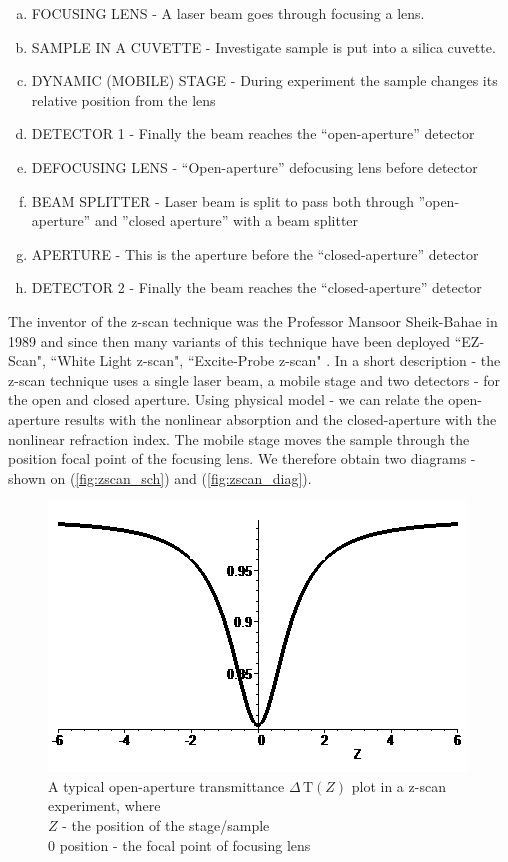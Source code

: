 \documentclass[12pt,twoside,a4paper]{article}
\numberwithin{equation}{subsection}
\numberwithin{figure}{subsection}
\begin{document}
\begin{enumerate}[(a)]
  \item FOCUSING LENS - A laser beam goes through focusing a lens.
  \item SAMPLE IN A CUVETTE - Investigate sample is put into a silica cuvette.
  \item DYNAMIC (MOBILE) STAGE - During experiment the sample changes its relative position from the lens
  \item DETECTOR 1 - Finally the beam reaches the ``open-aperture'' detector  
  \item DEFOCUSING LENS  - ``Open-aperture'' defocusing lens before detector
  \item BEAM SPLITTER - Laser beam is split to pass both through ''open-aperture'' and ''closed aperture'' with a beam splitter
  \item APERTURE - This is the aperture before the ``closed-aperture'' detector
  \item DETECTOR 2 - Finally the beam reaches the ``closed-aperture'' detector
\end{enumerate}


The inventor of the z-scan technique was the Professor Mansoor Sheik-Bahae in 1989 \cite{bahae_sensitive} and since then many variants of this technique have been deployed ``EZ-Scan", ``White Light z-scan", ``Excite-Probe z-scan" \cite{newport_application}. In a short description - the z-scan technique uses a single laser beam, a mobile stage and two detectors - for the open and closed aperture. Using physical model - we can relate the open-aperture results with the nonlinear absorption and the closed-aperture with the nonlinear refraction index. The mobile stage moves the sample through the position focal point of the focusing lens. We therefore obtain two diagrams - shown on (\ref{fig:zscan_sch}) and (\ref{fig:zscan_diag}).


\begin{figure}
  \includegraphics{img/oa_plot.png}
  \caption{A typical open-aperture transmittance $\Delta \,\mathrm{T}(Z)$ plot in a z-scan experiment, where \\ 
  $Z$ - the position of the stage/sample \\ 
  $0$ position - the focal point of focusing lens 
  \label{fig:oa_plot}}
\end{figure}
\end{document}
